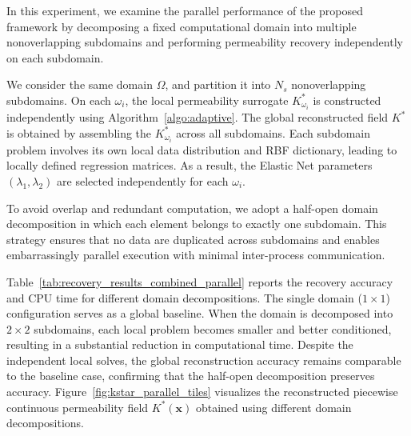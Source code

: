 \documentclass[final,1p,times]{elsarticle}
\theoremstyle{plain}
\theoremstyle{definition}
\theoremstyle{remark}
\newcommand{\bx}{\mathbf{x}}
\begin{document}
In this experiment, we examine the parallel performance of the proposed framework by decomposing a fixed computational domain into multiple nonoverlapping subdomains and performing permeability recovery independently on each subdomain.

We consider the same domain $\Omega$, and partition it into $N_s$ nonoverlapping subdomains.
On each $\omega_i$, the local permeability surrogate $K^*_{\omega_i}$ is
constructed independently using Algorithm~\ref{algo:adaptive}. The global reconstructed field $K^*$ is obtained by assembling the $K^*_{\omega_i}$ across all subdomains. Each subdomain problem involves its own local data distribution and RBF dictionary, leading to locally defined regression matrices. As a result, the Elastic Net parameters $(\lambda_1,\lambda_2)$ are selected independently for each $\omega_i$.

To avoid overlap and redundant computation, we adopt a half-open domain decomposition in which each element belongs to exactly one subdomain. This strategy ensures that no data are duplicated across subdomains and enables
embarrassingly parallel execution with minimal inter-process communication.

Table~\ref{tab:recovery_results_combined_parallel} reports the recovery accuracy and CPU time for different domain decompositions. The single domain ($1\times1$) configuration serves as a global baseline. When the domain is decomposed into $2\times2$ subdomains, each local problem
becomes smaller and better conditioned, resulting in a substantial reduction in
computational time. Despite the independent local solves, the global reconstruction accuracy remains
comparable to the baseline case, confirming that the half-open decomposition preserves accuracy. Figure~\ref{fig:kstar_parallel_tiles} visualizes the reconstructed piecewise continuous
permeability field $K^*(\bx)$ obtained using different domain decompositions.
\end{document}
